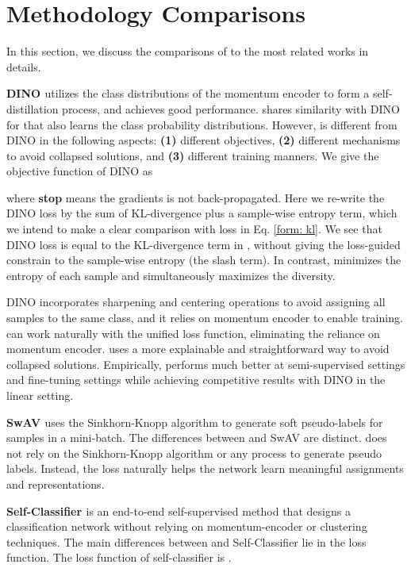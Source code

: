 \documentclass[10pt,twocolumn,letterpaper]{article}
\begin{document}
\section{Methodology Comparisons}\label{sec:comp}
In this section, we discuss the comparisons of \ourmethod to the most related works in details.

\textbf{DINO \cite{caron2021emerging}} utilizes the class distributions of the momentum encoder to form a self-distillation process, and achieves good performance. \ourmethod shares similarity with DINO for that \ourmethod also learns the class probability distributions. However, \ourmethod is different from DINO in the following aspects: \textbf{(1)} different objectives, \textbf{(2)} different mechanisms to avoid collapsed solutions, and \textbf{(3)} different training manners.
We give the objective function of DINO as 

where \textbf{stop} means the gradients is not back-propagated.
Here we re-write the DINO loss by the sum of KL-divergence plus a sample-wise entropy term, which we intend to make a clear comparison with \ourmethod loss in Eq. \ref{form: kl}. 
We see that DINO loss is equal to the KL-divergence term in \ourmethod, without giving the loss-guided constrain to the sample-wise entropy (the slash term). In contrast, \ourmethod minimizes the entropy of each sample and simultaneously maximizes the diversity.

DINO incorporates sharpening and centering operations to avoid assigning all samples to the same class, and it relies on momentum encoder to enable training.
\ourmethod can work naturally with the unified loss function, eliminating the reliance on momentum encoder. \ourmethod uses a more explainable and straightforward way to avoid collapsed solutions. 
Empirically, \ourmethod performs much better at semi-supervised settings and fine-tuning settings while achieving competitive results with DINO in the linear setting.

\textbf{SwAV \cite{caron2020unsupervised}} uses the Sinkhorn-Knopp algorithm \cite{asano2019self} to generate soft pseudo-labels for samples in a mini-batch. The differences between \ourmethod and SwAV are distinct. \ourmethod does not rely on the Sinkhorn-Knopp algorithm or any process to generate pseudo labels. Instead, the \ourmethod loss naturally helps the network learn meaningful assignments and representations.

\textbf{Self-Classifier \cite{amrani2021self}} is an end-to-end self-supervised method that designs a classification network without relying on momentum-encoder or clustering techniques. 
The main differences between \ourmethod and Self-Classifier lie in the loss function. The loss function of self-classifier is .
\end{document}
